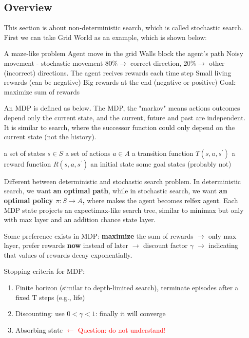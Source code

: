\subsection{Overview}
This section is about non-deterministic search, which is called stochastic search. First we can take Grid World as an example, which is shown below:

\begin{outline}
    \1 A maze-like problem
        \2 Agent move in the grid
        \2 Walls block the agent's path
    \1 Noisy movement - stochastic movement
        \2 $80\% \rightarrow$ correct direction, $20\% \rightarrow$ other (incorrect) directions.
    \1 The agent recives rewards each time step
        \2 Small living rewards (can be negative)
        \2 Big rewards at the end (negative or positive)
    \1 Goal: maximize sum of rewards
\end{outline}

\noindent
An MDP is defined as below. The MDP, the "markov" means actions outcomes depend only the current state, and the current, future and past are independent. It is similar to search, where the successor function could only depend on the current state (not the history). 
\begin{outline}
    \1 a set of states $s \in S$
    \1 a set of actions $ a \in A$
    \1 a transition function $T(s,a,s^{\prime})$
    \1 a reward function $R(s,a,s^{\prime})$
    \1 an initial state
    \1 some goal states (probably not)
\end{outline}

\noindent
Different between deterministic and stochastic search problem. In deterministic search, we want \textbf{an optimal path}, while in stochastic search, we want \textbf{an optimal policy $\pi: S \rightarrow A$,} where makes the agent becomes relfex agent. Each MDP state projects an expectimax-like search tree, similar to minimax but only with max layer and an addition chance state layer. 

\noindent
Some preference exists in MDP: \textbf{maximize} the sum of rewards $\rightarrow$ only max layer, prefer rewards \textbf{now} instead of later $\rightarrow$ discount factor $\gamma$ $\rightarrow$ indicating that values of rewards decay exponentially.

\noindent
Stopping criteria for MDP:
\begin{enumerate}
    \item Finite horizon (similar to depth-limited search), terminate episodes after a fixed T steps (e.g., life)
    \item Discounting: use $0 < \gamma < 1$: finally it will converge
    \item Absorbing state \textcolor{red}{$\leftarrow$ Question: do not understand!}
\end{enumerate}

